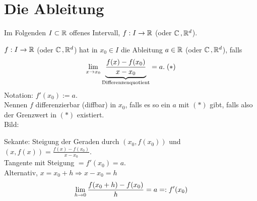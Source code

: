 \documentclass[../ana1.tex]{subfiles}
\begin{document}
\setcounter{section}{17}
\section{Die Ableitung}

Im Folgenden \( I \subset \mathbb{R} \) offenes Intervall, 
\( f: I \rightarrow \mathbb{R} \) (oder \( \mathbb{C} \operatorname{,} \mathbb{R}^d \)).

\begin{defi}[Ableitung]
    \( f : I \rightarrow \mathbb{R} \) (oder \( \mathbb{C} \operatorname{,} \mathbb{R}^d \)) 
    hat in \( x_0 \in I \) die Ableitung \( a\in \mathbb{R} \) 
    (oder \( \mathbb{C} \operatorname{,} \mathbb{R}^d \)), falls 
    \[ \lim\limits_{x\rightarrow x_0} \underbrace{\frac{f(x) - f(x_0)}{x - x_0}}_{
        \text{Differenzenquotient}
    } = a. \; (*) \]
    Notation: \( f'(x_0) := a \).\\
    Nennen \(f\) differenzierbar (diffbar) in \(x_0\), falls 
    es so ein \(a\) mit \((*)\) gibt, falls also der Grenzwert 
    in \((*)\) existiert.\\
    Bild:
    \begin{center}
    \end{center}
    Sekante: Steigung der Geraden durch \( (x_0, f(x_0)) \) und 
    \((x, f(x)) = \frac{f(x) - f(x_0)}{x - x_0}\).\\
    Tangente mit Steigung \( = f'(x_0) = a \).\\
    Alternativ, \( x = x_0 + h \Rightarrow x - x_0 = h \)
    \[ \lim\limits_{h\rightarrow 0} \frac{f(x_0 + h) - f(x_0)}{h} = a =: f'(x_0) \]
\end{defi}
\end{document}
